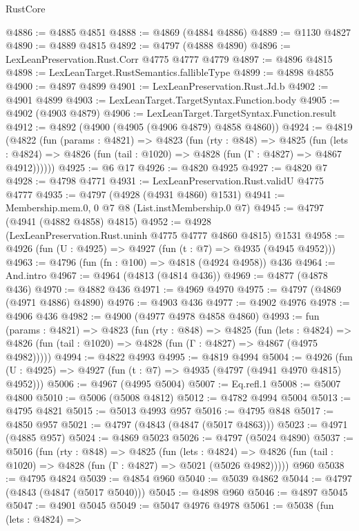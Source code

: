\begin{lexlean}{RustCore}
\begin{coremodule}
@4886 := @4885 @4851
@4888 := @4869 (@4884 @4886)
@4889 := @1130 @4827
@4890 := @4889 @4815
@4892 := @4797 (@4888 @4890)
@4896 := LexLeanPreservation.Rust.Corr @4775 @4777 @4779
@4897 := @4896 @4815
@4898 := LexLeanTarget.RustSemantics.fallibleType
@4899 := @4898 @4855
@4900 := @4897 @4899
@4901 := LexLeanPreservation.Rust.Jd.b
@4902 := @4901 @4899
@4903 := LexLeanTarget.TargetSyntax.Function.body
@4905 := @4902 (@4903 @4879)
@4906 := LexLeanTarget.TargetSyntax.Function.result
@4912 := @4892 (@4900 (@4905 (@4906 @4879) @4858 @4860))
@4924 := @4819
    (@4822
      (fun (params : @4821) =>
      @4823
        (fun (rty : @848) =>
        @4825
          (fun (lets : @4824) =>
          @4826 (fun (tail : @1020) => @4828 (fun (Γ : @4827) => @4867 @4912))))))
@4925 := @6 @17
@4926 := @4820 @4925
@4927 := @4820 @7
@4928 := @4798 @4771
@4931 := LexLeanPreservation.Rust.validU @4775 @4777
@4935 := @4797 (@4928 (@4931 @4860) @1531)
@4941 := Membership.mem.{0, 0} @7 @8 (List.instMembership.{0} @7)
@4945 := @4797 (@4941 (@4882 @4858) @4815)
@4952 := @4928 (LexLeanPreservation.Rust.uninh @4775 @4777 @4860 @4815) @1531
@4958 := @4926 (fun (U : @4925) => @4927 (fun (t : @7) => @4935 (@4945 @4952)))
@4963 := @4796 (fun (fn : @100) => @4818 (@4924 @4958)) @436
@4964 := And.intro
@4967 := @4964 (@4813 (@4814 @436))
@4969 := @4877 (@4878 @436)
@4970 := @4882 @436
@4971 := @4969 @4970
@4975 := @4797 (@4869 (@4971 @4886) @4890)
@4976 := @4903 @436
@4977 := @4902 @4976
@4978 := @4906 @436
@4982 := @4900 (@4977 @4978 @4858 @4860)
@4993 := fun (params : @4821) =>
  @4823
    (fun (rty : @848) =>
    @4825
      (fun (lets : @4824) =>
      @4826 (fun (tail : @1020) => @4828 (fun (Γ : @4827) => @4867 (@4975 @4982)))))
@4994 := @4822 @4993
@4995 := @4819 @4994
@5004 := @4926 (fun (U : @4925) => @4927 (fun (t : @7) => @4935 (@4797 (@4941 @4970 @4815) @4952)))
@5006 := @4967 (@4995 @5004)
@5007 := Eq.refl.{1}
@5008 := @5007 @4800
@5010 := @5006 (@5008 @4812)
@5012 := @4782 @4994 @5004
@5013 := @4795 @4821
@5015 := @5013 @4993 @957
@5016 := @4795 @848
@5017 := @4850 @957
@5021 := @4797 (@4843 (@4847 (@5017 @4863)))
@5023 := @4971 (@4885 @957)
@5024 := @4869 @5023
@5026 := @4797 (@5024 @4890)
@5037 := @5016
    (fun (rty : @848) =>
    @4825
      (fun (lets : @4824) =>
      @4826 (fun (tail : @1020) => @4828 (fun (Γ : @4827) => @5021 (@5026 @4982)))))
    @960
@5038 := @4795 @4824
@5039 := @4854 @960
@5040 := @5039 @4862
@5044 := @4797 (@4843 (@4847 (@5017 @5040)))
@5045 := @4898 @960
@5046 := @4897 @5045
@5047 := @4901 @5045
@5049 := @5047 @4976 @4978
@5061 := @5038
    (fun (lets : @4824) =>

\end{coremodule}
\end{lexlean}
